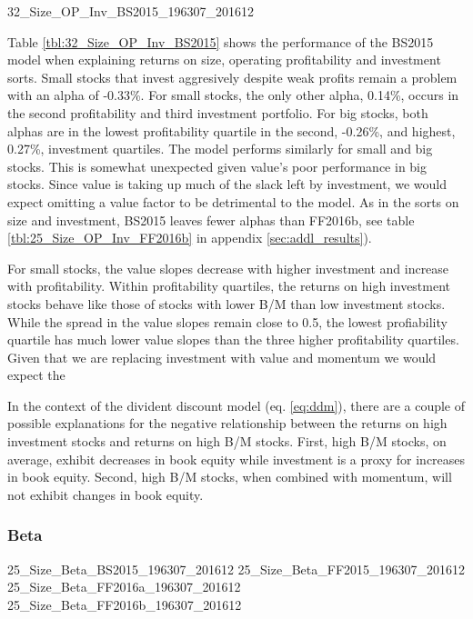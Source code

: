 \begin{landscape}
{32_Size_OP_Inv_BS2015_196307_201612}
\end{landscape}

Table \ref{tbl:32_Size_OP_Inv_BS2015} shows the performance of the BS2015 model when
explaining returns on size, operating profitability and investment sorts. Small stocks
that invest aggresively despite weak profits remain a problem with an alpha of -0.33\%.
For small stocks, the only other alpha, 0.14\%, occurs in the second profitability and
third investment portfolio. For big stocks, both alphas are in the lowest profitability
quartile in the second, -0.26\%, and highest, 0.27\%, investment quartiles. The model
performs similarly for small and big stocks. This is somewhat unexpected given value's
poor performance in big stocks. Since value is taking up much of the slack left by
investment, we would expect omitting a value factor to be detrimental to the model. As in
the sorts on size and investment, BS2015 leaves fewer alphas than FF2016b, see table
\ref{tbl:25_Size_OP_Inv_FF2016b} in appendix \ref{sec:addl_results}).

For small stocks, the value slopes decrease with higher investment and increase with
profitability. Within profitability quartiles, the returns on high investment stocks
behave like those of stocks with lower B/M than low investment stocks. While the spread in
the value slopes remain close to 0.5, the lowest profiability quartile has much lower
value slopes than the three higher profitability quartiles.
Given that we are replacing investment with value and momentum we would expect the 

In the context of the divident
discount model (eq. \ref{eq:ddm}), there are a couple of possible explanations for the
negative relationship between the returns on high investment stocks and returns on high
B/M stocks. First,  high B/M stocks, on average, exhibit decreases in book equity
\parencite{kok2017facts} while investment is a proxy for increases in book equity. Second,
high B/M stocks, when combined with momentum, will not exhibit changes in book equity.

\subsubsection{Beta}

{25_Size_Beta_BS2015_196307_201612}
{25_Size_Beta_FF2015_196307_201612}
{25_Size_Beta_FF2016a_196307_201612}
{25_Size_Beta_FF2016b_196307_201612}

